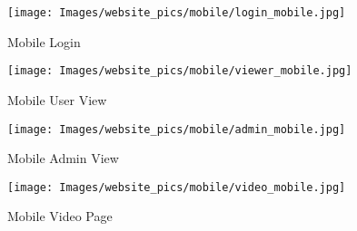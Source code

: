 \documentclass[onecolumn, draftclsnofoot,10pt, compsoc]{IEEEtran}
\begin{document}
        \begin{figure}
            \centering
            \texttt{[image: Images/website\_pics/mobile/login\_mobile.jpg]}
            \centering\caption{Mobile Login}
            \label{fig:MLogin}
        \end{figure}
        
        \begin{figure}
            \centering
            \texttt{[image: Images/website\_pics/mobile/viewer\_mobile.jpg]}
            \centering\caption{Mobile User View}
            \label{fig:MUser}
        \end{figure}
        
        \begin{figure}
            \centering
            \texttt{[image: Images/website\_pics/mobile/admin\_mobile.jpg]}
            \centering\caption{Mobile Admin View}
            \label{fig:MAdmin}
        \end{figure}

        \begin{figure}
            \centering
            \texttt{[image: Images/website\_pics/mobile/video\_mobile.jpg]}
            \centering\caption{Mobile Video Page}
            \label{fig:MVideo}
        \end{figure}
\end{document}
